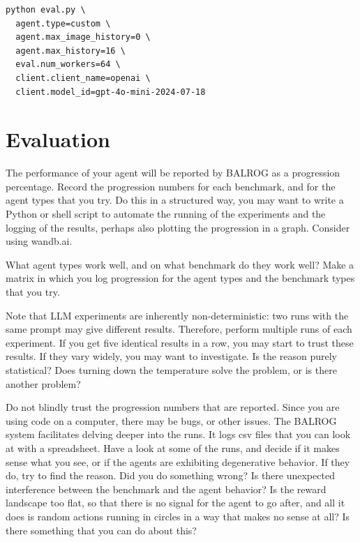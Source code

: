 \begin{listing}
    \begin{verbatim}
python eval.py \
  agent.type=custom \
  agent.max_image_history=0 \
  agent.max_history=16 \
  eval.num_workers=64 \
  client.client_name=openai \
  client.model_id=gpt-4o-mini-2024-07-18        
    \end{verbatim}
    \caption{Running the Agent  evaluation}\label{lst:agent-run}
\end{listing}

\section{Evaluation}
The performance of your agent will be reported by BALROG as a progression percentage. Record the progression numbers for each benchmark, and for the agent types that you try. Do this in a structured way, you may want to write a Python or shell script to automate the running of the experiments and the logging of the results, perhaps also plotting the progression in a graph. Consider using wandb.ai.

What agent types work well, and on what benchmark do they work well? Make a matrix in which you log progression for the agent types and the benchmark types that you try.

Note that LLM experiments are inherently non-deterministic: two runs with the same prompt may give different results. Therefore, perform multiple runs of each experiment. If you get five identical results in a row, you may start to trust these results. If they vary widely, you may want to investigate. Is the reason purely statistical? Does turning down the temperature solve the problem, or is there another problem?

Do not blindly trust the progression numbers that are reported. Since you are using code on a computer, there may be bugs, or other issues. The BALROG system facilitates delving deeper into the runs. It logs csv files that you can look at with a spreadsheet. Have a look at some of the runs, and decide if it makes sense what you see, or if the agents are exhibiting degenerative behavior. If they do, try to find the reason. Did you do something wrong? Is there unexpected interference between the benchmark and the agent behavior?
Is the reward landscape too flat, so that there is no signal for the agent to go after, and all it does is random actions running in circles in a way that makes no sense at all? Is there something that you can do about this?

